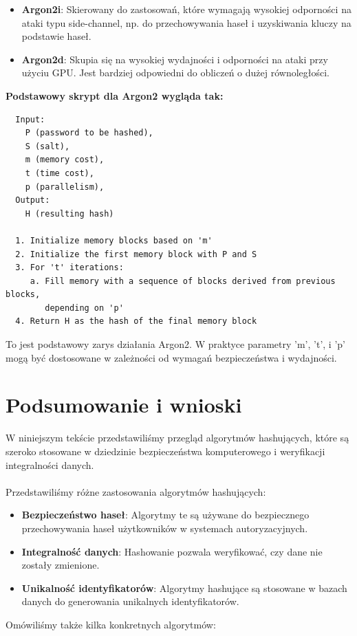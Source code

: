 \documentclass[12pt, letterpaper]{article}
\begin{document}
\begin{itemize}
    \item \textbf{Argon2i}: Skierowany do zastosowań, które wymagają wysokiej odporności na ataki typu side-channel, np. do przechowywania haseł i uzyskiwania kluczy na podstawie haseł.\\
    \item \textbf{Argon2d}: Skupia się na wysokiej wydajności i odporności na ataki przy użyciu GPU. Jest bardziej odpowiedni do obliczeń o dużej równoległości.
\end{itemize}
\newpage
\textbf{Podstawowy skrypt dla Argon2 wygląda tak:}

\begin{verbatim}
  Input:
    P (password to be hashed),
    S (salt),
    m (memory cost),
    t (time cost),
    p (parallelism),
  Output:
    H (resulting hash)
  
  1. Initialize memory blocks based on 'm'
  2. Initialize the first memory block with P and S
  3. For 't' iterations:
     a. Fill memory with a sequence of blocks derived from previous blocks, 
        depending on 'p'
  4. Return H as the hash of the final memory block
\end{verbatim}

To jest podstawowy zarys działania Argon2. W praktyce parametry 'm', 't', i 'p' mogą być dostosowane w zależności od wymagań bezpieczeństwa i wydajności.

\newpage
\section{Podsumowanie i wnioski}
W niniejszym tekście przedstawiliśmy przegląd algorytmów hashujących, które są szeroko stosowane w dziedzinie bezpieczeństwa komputerowego i weryfikacji integralności danych.
\\
\\
Przedstawiliśmy różne zastosowania algorytmów hashujących:
\begin{itemize}
    \item \textbf{Bezpieczeństwo haseł}: Algorytmy te są używane do bezpiecznego przechowywania haseł użytkowników w systemach autoryzacyjnych.
    \item \textbf{Integralność danych}: Hashowanie pozwala weryfikować, czy dane nie zostały zmienione.
    \item \textbf{Unikalność identyfikatorów}: Algorytmy hashujące są stosowane w bazach danych do generowania unikalnych identyfikatorów.
\end{itemize}
Omówiliśmy także kilka konkretnych algorytmów:
\end{document}
